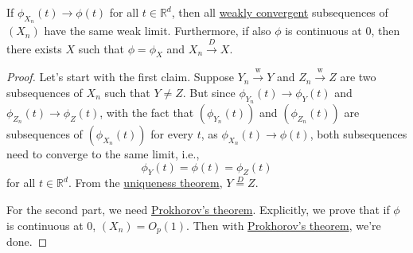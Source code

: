 \begin{theorem}
	If \(\phi _{X_n}(t) \to \phi (t)\) for all \(t \in \mathbb{R} ^d\), then all \hyperref[def:converge-weakly]{weakly convergent} subsequences of \((X_n)\) have the same weak limit. Furthermore, if also \(\phi \) is continuous at \(0\), then there exists \(X\) such that \(\phi = \phi _X\)  and \(X_n \overset{D}{\to } X\).
\end{theorem}
\begin{proof}
	Let's start with the first claim. Suppose \(Y_n \overset{\text{w} }{\to } Y\) and \(Z_n \overset{\text{w} }{\to } Z\) are two subsequences of \(X_n\) such that \(Y \neq Z\). But since \(\phi _{Y_n}(t) \to \phi _Y(t)\) and \(\phi _{Z_n}(t) \to \phi _Z(t)\), with the fact that \((\phi _{Y_n}(t))\) and \((\phi _{Z_n}(t))\) are subsequences of \((\phi _{X_n}(t))\) for every \(t\), as \(\phi _{X_n}(t) \to \phi (t)\), both subsequences need to converge to the same limit, i.e.,
	\[
		\phi _Y(t) = \phi (t) = \phi _Z(t)
	\]
	for all \(t \in \mathbb{R} ^d\). From the \hyperref[thm:uniqueness]{uniqueness theorem}, \(Y \overset{D}{=} Z\).

	For the second part, we need \hyperref[thm:Prokhorov]{Prokhorov's theorem}. Explicitly, we prove that if \(\phi \) is continuous at \(0\), \((X_n) = O_p(1)\). Then with \hyperref[thm:Prokhorov]{Prokhorov's theorem}, we're done.
\end{proof}